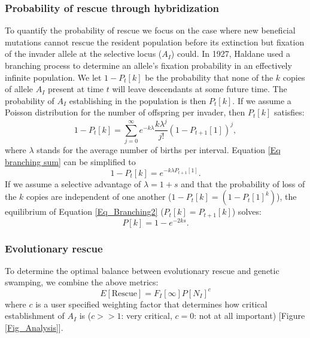 \documentclass[a4paper,10pt]{article}
\begin{document}
	\subsubsection*{Probability of rescue through hybridization}
	To quantify the probability of rescue we focus on the case where new beneficial mutations cannot rescue the resident population before its extinction but fixation of the invader allele at the selective locus ($A_I$) could. In 1927, Haldane used a branching process to determine an allele's fixation probability in an effectively infinite population. We let $1-P_t[k]$ be the probability that none of the $k$ copies of allele $A_I$ present at time $t$ will leave descendants at some future time.  The probability of $A_I$ establishing in the population is then $P_t[k]$.  If we assume a Poisson distribution for the number of offspring per invader, then $P_t[k]$ satisfies:
	\begin{equation}
	1-P_t[k] = \sum_{j=0}^{\infty} e^{-k \lambda} \frac{k \lambda^j}{j!} (1-P_{t+1}[1])^j,
	\label{Eq branching sum}
	\end{equation}
	where $\lambda$ stands for the average number of births per interval. Equation \ref{Eq branching sum} can be simplified to
	\begin{equation}
	1-P_t[k] = e^{-k \lambda P_{t+1}[1]}.
	\label{Eq_Branching2}
	\end{equation}
	If we assume a selective advantage of $\lambda = 1+s$ and that the probability of loss of the $k$ copies are independent of one another ($1-P_t[k] = (1-P_t[1]^k)$), the equilibrium of Equation \ref{Eq_Branching2} ($P_t[k] = P_{t+1}[k]$) solves:
	\begin{equation}
	P[k] = 1-e^{-2 k s}.
	\label{Eq_fix}
	\end{equation}
	
	\subsubsection*{Evolutionary rescue}
	
	To determine the optimal balance between evolutionary rescue and genetic swamping, we combine the above metrics:  
	\begin{equation}
	E[\text{Rescue}] = F_I[\infty] P[N_I]^c
	\label{Eq_Rescue}
	\end{equation}
	where $c$ is a user specified weighting factor that determines how critical establishment of $A_I$ is ($c>>1$: very critical, $c=0$: not at all important) [Figure \ref{Fig_Analysis}].
	
\end{document}
